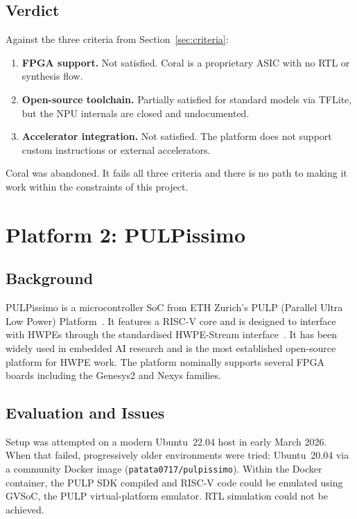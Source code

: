\documentclass[journal]{IEEEtran}
\begin{document}
\subsection{Verdict}

Against the three criteria from Section~\ref{sec:criteria}:

\begin{enumerate}
  \item \textbf{FPGA support.} Not satisfied. Coral is a proprietary ASIC
        with no RTL or synthesis flow.
  \item \textbf{Open-source toolchain.} Partially satisfied for standard
        models via TFLite, but the NPU internals are closed and
        undocumented.
  \item \textbf{Accelerator integration.} Not satisfied. The platform
        does not support custom instructions or external accelerators.
\end{enumerate}

Coral was abandoned. It fails all three criteria and there is no path to making it
work within the constraints of this project.

\section{Platform 2: PULPissimo}
\label{sec:pulpissimo}

\subsection{Background}

PULPissimo is a microcontroller SoC from ETH Zurich's PULP (Parallel Ultra
Low Power) Platform~\cite{schiavone2017slow}. It features a RISC-V core
and is designed to interface with HWPEs through the standardised HWPE-Stream
interface~\cite{conti2018xne}. It has been widely used in embedded AI
research and is the most established open-source platform for HWPE work.
The platform nominally supports several FPGA boards including the Genesys2
and Nexys families.

\subsection{Evaluation and Issues}

Setup was attempted on a modern Ubuntu~22.04 host in early March 2026. When
that failed, progressively older environments were tried: Ubuntu~20.04 via
a community Docker image (\texttt{patata0717/pulpissimo}). Within the
Docker container, the PULP SDK compiled and RISC-V code could be emulated
using GVSoC, the PULP virtual-platform emulator. RTL simulation could not
be achieved.
\end{document}

